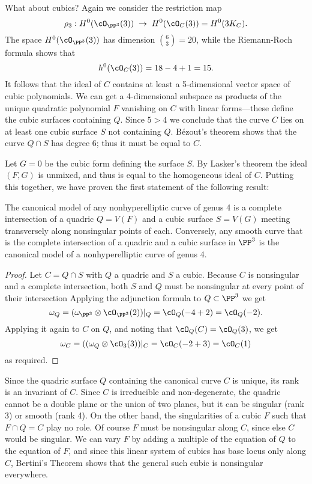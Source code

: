 What about cubics? Again we consider the restriction map
$$
\rho_3 : H^0(\cO_{\PP^3}(3)) \; \to \; H^0(\cO_{C}(3)) = H^0(3K_C).
$$
The space $H^0(\cO_{\PP^3}(3))$ has dimension $\binom{6}{3} = 20$, while  the Riemann-Roch formula shows that
$$
h^0(\cO_C(3)) = 18 - 4 + 1 = 15.
$$
It follows that the ideal of $C$ contains at least a 5-dimensional vector space of cubic polynomials. We can get a 4-dimensional subspace as products of the unique quadratic polynomial $F$ vanishing on $C$ with linear forms---these define the cubic surfaces containing $Q$. Since $5 > 4$ we  conclude that the curve $C$ lies on at least one cubic surface $S$  not containing $Q$. 
B\'ezout's theorem shows that the curve $Q \cap S$ has degree 6; thus it must be equal to $C$. 

Let $G=0$ be the cubic form defining the surface $S$. By Lasker's theorem the ideal $(F,G)$ is unmixed, and thus is equal to the homogeneous ideal of $C$. Putting this together, we have proven the first statement of the following result:

\begin{theorem}
The canonical model of any nonhyperelliptic curve of genus 4 is a complete intersection of a quadric $Q = V(F)$ and a cubic surface $S = V(G)$ meeting transversely along nonsingular points of each. Conversely, any smooth curve that is the complete intersection of a quadric and a cubic surface in $\PP^3$ is the canonical model of a nonhyperelliptic curve of genus 4.
\end{theorem}
 
\begin{proof}
Let $C = Q\cap S$ with $Q$ a quadric and $S$ a cubic. Because $C$ is nonsingular and a complete intersection, both $S$ and $Q$ must be nonsingular at every point of their intersection Applying the adjunction formula to $Q\subset \PP^3$ we get
$$
\omega_Q = (\omega_{\PP^3} \otimes \cO_{\PP^3}(2))|_Q = \cO_Q(-4+2) = \cO_Q(-2).
$$
Applying it again to $C$ on $Q$, and noting that $\cO_Q(C) = \cO_Q(3)$, we get
$$
\omega_C = ((\omega_{Q} \otimes \cO_{3}(3))|_C = \cO_C(-2+3) = \cO_C(1)
$$
as required. 
\end{proof}

Since the quadric surface $Q$ containing the canonical curve $C$  is unique, its rank is an invariant of $C$.
Since $C$ is irreducible and non-degenerate, the quadric cannot be a double plane or the union of two planes, but it can be singular (rank 3) or smooth (rank 4). On the other hand, the singularities of a cubic $F$ such that $F\cap Q = C$ play no role. Of course $F$ must be nonsingular along $C$, since else 
$C$ would be singular. We can vary $F$ by adding a multiple of the equation of $Q$ to the equation of $F$, and since this linear system of cubics has base locus only along $C$, Bertini's Theorem shows that the general such cubic is nonsingular everywhere.

